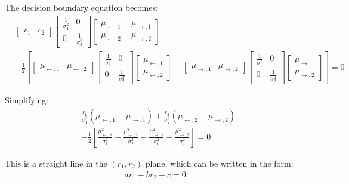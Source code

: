 \documentclass{article}
\begin{document}
The decision boundary equation becomes:
\begin{align}
&\left[\begin{array}{cc} r_1 & r_2 \end{array}\right] \left[\begin{array}{cc} \frac{1}{\sigma_1^2} & 0 \\ 0 & \frac{1}{\sigma_2^2} \end{array}\right] \left[\begin{array}{c} \mu_{\leftarrow,1} - \mu_{\rightarrow,1} \\ \mu_{\leftarrow,2} - \mu_{\rightarrow,2} \end{array}\right] \\
&- \frac{1}{2}\left[ \left[\begin{array}{cc} \mu_{\leftarrow,1} & \mu_{\leftarrow,2} \end{array}\right] \left[\begin{array}{cc} \frac{1}{\sigma_1^2} & 0 \\ 0 & \frac{1}{\sigma_2^2} \end{array}\right] \left[\begin{array}{c} \mu_{\leftarrow,1} \\ \mu_{\leftarrow,2} \end{array}\right] - \left[\begin{array}{cc} \mu_{\rightarrow,1} & \mu_{\rightarrow,2} \end{array}\right] \left[\begin{array}{cc} \frac{1}{\sigma_1^2} & 0 \\ 0 & \frac{1}{\sigma_2^2} \end{array}\right] \left[\begin{array}{c} \mu_{\rightarrow,1} \\ \mu_{\rightarrow,2} \end{array}\right] \right] = 0
\end{align}

Simplifying:
\begin{align}
&\frac{r_1}{\sigma_1^2}(\mu_{\leftarrow,1} - \mu_{\rightarrow,1}) + \frac{r_2}{\sigma_2^2}(\mu_{\leftarrow,2} - \mu_{\rightarrow,2}) \\
&- \frac{1}{2}\left[ \frac{\mu_{\leftarrow,1}^2}{\sigma_1^2} + \frac{\mu_{\leftarrow,2}^2}{\sigma_2^2} - \frac{\mu_{\rightarrow,1}^2}{\sigma_1^2} - \frac{\mu_{\rightarrow,2}^2}{\sigma_2^2} \right] = 0
\end{align}

This is a straight line in the $(r_1, r_2)$ plane, which can be written in the form:
\begin{align}
a r_1 + b r_2 + c = 0
\end{align}
\end{document}

